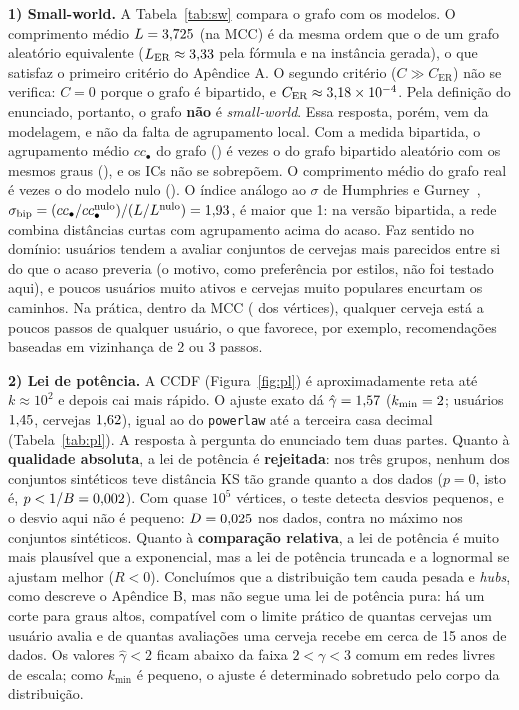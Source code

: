 \documentclass[sigconf]{webmedia}
\begin{document}
\textbf{1) Small-world.} A Tabela~\ref{tab:sw} compara o grafo com os modelos. O comprimento médio
$L=3{,}725$ (na MCC) é da mesma ordem que o de um grafo aleatório equivalente
($L_{\text{ER}}\approx3{,}33$ pela fórmula e \LERsim{} na instância gerada), o que satisfaz o
primeiro critério do Apêndice A. O segundo critério ($C \gg C_{\text{ER}}$) não se verifica: $C=0$
porque o grafo é bipartido, e $C_{\text{ER}}\approx3{,}18\times 10^{-4}$. Pela definição do enunciado,
portanto, o grafo \textbf{não} é \textit{small-world}. Essa resposta, porém, vem da modelagem, e
não da falta de agrupamento local. Com a medida bipartida, o agrupamento médio $cc_\bullet$ do
grafo (\LatapyG{}) é \LatapyRazao{} vezes o do grafo bipartido aleatório com os mesmos graus
(\LatapyR{}), e os ICs não se sobrepõem. O comprimento médio do grafo real é \RazaoL{} vezes o do
modelo nulo (\LBipR{}). O índice análogo ao $\sigma$ de Humphries e Gurney~\cite{humphries2008},
$\sigma_{\text{bip}}=(cc_\bullet/cc_\bullet^{\text{nulo}})/(L/L^{\text{nulo}})=1{,}93$, é maior
que 1: na versão bipartida, a rede combina distâncias curtas com agrupamento acima do acaso.
Faz sentido no domínio: usuários tendem a avaliar conjuntos de cervejas mais parecidos entre si
do que o acaso preveria (o motivo, como preferência por estilos, não foi testado aqui), e poucos
usuários muito ativos e
cervejas muito populares encurtam os caminhos. Na prática, dentro da MCC (\MCCPercent{} dos
vértices), qualquer cerveja está a poucos passos de qualquer usuário, o que favorece, por exemplo,
recomendações baseadas em vizinhança de 2 ou 3 passos.



\textbf{2) Lei de potência.} A CCDF (Figura~\ref{fig:pl}) é aproximadamente reta até
$k\approx 10^2$ e depois cai mais rápido. O ajuste exato dá $\hat\gamma=1{,}57$
($k_{\min}=2$; usuários $1{,}45$, cervejas $1{,}62$), igual ao do \texttt{powerlaw}
até a terceira casa decimal (Tabela~\ref{tab:pl}). A resposta à pergunta do enunciado tem duas
partes. Quanto à \textbf{qualidade absoluta}, a lei de potência é \textbf{rejeitada}: nos três
grupos, nenhum dos \BBoot{} conjuntos sintéticos teve distância KS tão grande quanto a dos dados
($p = 0$, isto é, $p < 1/B = 0{,}002$). Com quase $10^5$ vértices, o teste detecta desvios pequenos, e o desvio aqui
não é pequeno: $D=0{,}025$ nos dados, contra no máximo \KSSintMax{} nos conjuntos sintéticos.
Quanto à \textbf{comparação relativa}, a lei de potência é muito mais plausível que a
exponencial, mas a lei de potência truncada e a lognormal se ajustam melhor ($R<0$). Concluímos
que a distribuição tem cauda pesada e \textit{hubs}, como descreve o Apêndice B, mas não segue
uma lei de potência pura: há um corte para graus altos, compatível com o limite prático de quantas
cervejas um usuário avalia e de quantas avaliações uma cerveja recebe em cerca de 15 anos de
dados. Os valores $\hat\gamma<2$ ficam abaixo da faixa $2<\gamma<3$ comum em redes livres de
escala; como $k_{\min}$ é pequeno, o ajuste é determinado sobretudo pelo corpo da distribuição.
\end{document}
